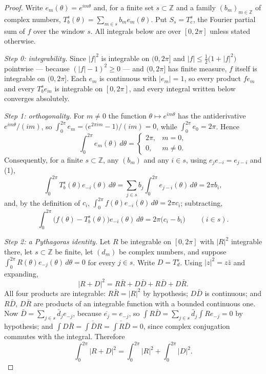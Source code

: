 \begin{proof}
Write $e_m(\theta)=e^{im\theta}$ and, for a finite set $s\subset\mathbb{Z}$ and
a family $(b_m)_{m\in\mathbb{Z}}$ of complex numbers,
$T_b^s(\theta)=\sum_{m\in s}b_me_m(\theta)$.  Put
$S_s=T_c^s$, the Fourier partial sum of $f$ over the window $s$.  All integrals
below are over $[0,2\pi]$ unless stated otherwise.

\emph{Step 0: integrability.}  Since $|f|^2$ is integrable on $(0,2\pi]$ and
$|f|\le\tfrac12\bigl(1+|f|^2\bigr)$ pointwise --- because
$(|f|-1)^2\ge0$ --- and $(0,2\pi]$ has finite measure, $f$ itself is integrable
on $(0,2\pi]$.  Each $e_m$ is continuous with $|e_m|=1$, so every product
$fe_m$ and every $T_b^se_m$ is integrable on $[0,2\pi]$, and every integral
written below converges absolutely.

\emph{Step 1: orthogonality.}  For $m\neq0$ the function
$\theta\mapsto e^{im\theta}$ has the antiderivative
$e^{im\theta}/(im)$, so
$\int_0^{2\pi}e_m=\bigl(e^{2\pi im}-1\bigr)/(im)=0$, while
$\int_0^{2\pi}e_0=2\pi$.  Hence
\begin{equation}\tag{1}
  \int_0^{2\pi}e_m(\theta)\,d\theta=\begin{cases}2\pi,&m=0,\\0,&m\neq0.\end{cases}
\end{equation}
Consequently, for a finite $s\subset\mathbb{Z}$, any $(b_m)$ and any $i\in s$,
using $e_je_{-i}=e_{j-i}$ and (1),
\begin{equation}\tag{2}
  \int_0^{2\pi}T_b^s(\theta)e_{-i}(\theta)\,d\theta
  =\sum_{j\in s}b_j\int_0^{2\pi}e_{j-i}(\theta)\,d\theta=2\pi b_i ,
\end{equation}
and, by the definition of $c_i$,
$\int_0^{2\pi}f(\theta)e_{-i}(\theta)\,d\theta=2\pi c_i$; subtracting,
\begin{equation}\tag{3}
  \int_0^{2\pi}\bigl(f(\theta)-T_b^s(\theta)\bigr)e_{-i}(\theta)\,d\theta
  =2\pi\bigl(c_i-b_i\bigr)\qquad(i\in s).
\end{equation}

\emph{Step 2: a Pythagoras identity.}  Let $R$ be integrable on $[0,2\pi]$ with
$|R|^2$ integrable there, let $s\subset\mathbb{Z}$ be finite, let $(d_m)$ be
complex numbers, and suppose
$\int_0^{2\pi}R(\theta)e_{-j}(\theta)\,d\theta=0$ for every $j\in s$.  Write
$D=T_d^s$.  Using $|z|^2=z\bar z$ and expanding,
\[
  |R+D|^2=R\bar R+D\bar D+R\bar D+D\bar R .
\]
All four products are integrable: $R\bar R=|R|^2$ by hypothesis; $D\bar D$ is
continuous; and $R\bar D$, $D\bar R$ are products of an integrable function
with a bounded continuous one.  Now
$\bar D=\sum_{j\in s}\bar d_je_{-j}$, because $\overline{e_j}=e_{-j}$, so
$\int R\bar D=\sum_{j\in s}\bar d_j\int Re_{-j}=0$ by hypothesis; and
$\int D\bar R=\overline{\int \bar D R}=\overline{\int R\bar D}=0$, since
complex conjugation commutes with the integral.  Therefore
\begin{equation}\tag{4}
  \int_0^{2\pi}|R+D|^2=\int_0^{2\pi}|R|^2+\int_0^{2\pi}|D|^2 .
\end{equation}


\end{proof}
